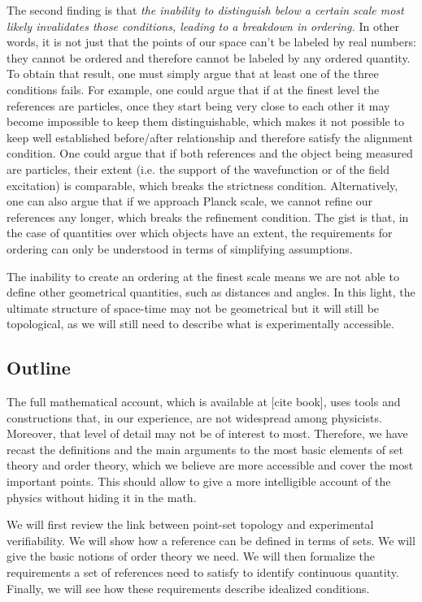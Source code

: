 \documentclass[12pt]{iopart}
\begin{document}
The second finding is that \emph{the inability to distinguish below a certain scale most likely invalidates those conditions, leading to a breakdown in ordering.} In other words, it is not just that the points of our space can't be labeled by real numbers: they cannot be ordered and therefore cannot be labeled by any ordered quantity. To obtain that result, one must simply argue that at least one of the three conditions fails. For example, one could argue that if at the finest level the references are particles, once they start being very close to each other it may become impossible to keep them distinguishable, which makes it not possible to keep well established before/after relationship and therefore satisfy the alignment condition. One could argue that if both references and the object being measured are particles, their extent (i.e. the support of the wavefunction or of the field excitation) is comparable, which breaks the strictness condition. Alternatively, one can also argue that if we approach Planck scale, we cannot refine our references any longer, which breaks the refinement condition. The gist is that, in the case of quantities over which objects have an extent, the requirements for ordering can only be understood in terms of simplifying assumptions.

The inability to create an ordering at the finest scale means we are not able to define other geometrical quantities, such as distances and angles. In this light, the ultimate structure of space-time may not be geometrical but it will still be topological, as we will still need to describe what is experimentally accessible.

\subsection{Outline}

The full mathematical account, which is available at [cite book], uses tools and constructions that, in our experience, are not widespread among physicists. Moreover, that level of detail may not be of interest to most. Therefore, we have recast the definitions and the main arguments to the most basic elements of set theory and order theory, which we believe are more accessible and cover the most important points. This should allow to give a more intelligible account of the physics without hiding it in the math.

We will first review the link between point-set topology and experimental verifiability. We will show how a reference can be defined in terms of sets. We will give the basic notions of order theory we need. We will then formalize the requirements a set of references need to satisfy to identify continuous quantity. Finally, we will see how these requirements describe idealized conditions.
\end{document}
